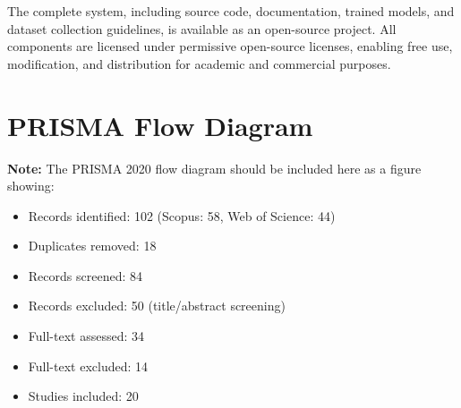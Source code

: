 The complete system, including source code, documentation, trained models, and dataset collection guidelines, is available as an open-source project. All components are licensed under permissive open-source licenses, enabling free use, modification, and distribution for academic and commercial purposes.

\section{PRISMA Flow Diagram}
\label{app:prisma}

\textbf{Note:} The PRISMA 2020 flow diagram should be included here as a figure showing:
\begin{itemize}
    \item Records identified: 102 (Scopus: 58, Web of Science: 44)
    \item Duplicates removed: 18
    \item Records screened: 84
    \item Records excluded: 50 (title/abstract screening)
    \item Full-text assessed: 34
    \item Full-text excluded: 14
    \item Studies included: 20
\end{itemize}

